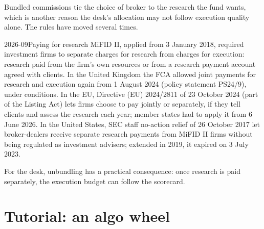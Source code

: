 Bundled commissions tie the choice of broker to the research the fund wants, which is another reason the desk's allocation may not follow execution
quality alone. The rules have moved several times.

\begin{dated}{2026-09}{Paying for research}\label{dat:mx:the-buy-side-trading-desk-and-its-brokers:research}
MiFID II, applied from 3 January 2018, required investment firms to separate charges for research from charges for execution: research paid from the
firm's own resources or from a research payment account agreed with clients. In the United Kingdom the FCA allowed joint payments for research and
execution again from 1 August 2024 (policy statement PS24/9), under conditions. In the EU, Directive (EU) 2024/2811 of 23 October 2024 (part of the
Listing Act) lets firms choose to pay jointly or separately, if they tell clients and assess the research each year; member states had to apply it
from 6 June 2026. In the United States, SEC staff no-action relief of 26 October 2017 let broker-dealers receive separate research payments from
MiFID II firms without being regulated as investment advisers; extended in 2019, it expired on 3 July 2023.
\end{dated}

For the desk, unbundling has a practical consequence: once research is paid separately, the execution budget can follow the scorecard.

\section{Tutorial: an algo wheel}\label{tut:mx:the-buy-side-trading-desk-and-its-brokers:tut}

